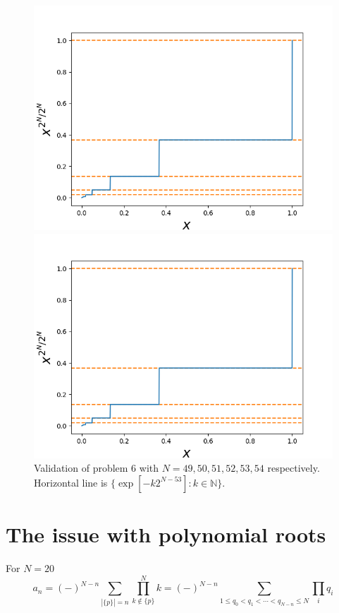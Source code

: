 \documentclass[11pt]{article}
\numberwithin{equation}{section} %
\begin{document}
\begin{figure}[!htp]
\begin{minipage}[b]{0.5\linewidth}
    \includegraphics[width=\linewidth]{p6_53.png}
  \end{minipage}%
  \begin{minipage}[b]{0.5\linewidth}
    \centering
    \includegraphics[width=\linewidth]{p6_54.png}
  \end{minipage}
  \caption{Validation of problem 6 with $N = 49, 50, 51, 52, 53, 54$
  respectively. Horizontal line is $\{\exp[-k2^{N-53}]: k\in\mathbb N\}$. 
\label{fig:p6_val}} 
\end{figure}

\section{The issue with polynomial roots}
For $N = 20$
\begin{equation}
  a_n = (-)^{N-n}\sum_{|\{p\}|=n} \prod^N_{k\notin \{p\}} k
  = (-)^{N-n}\sum_{1\le q_0 < q_1 < \cdots < q_{N-n} \le N}
  \prod_i q_i
\end{equation}
\end{document}
